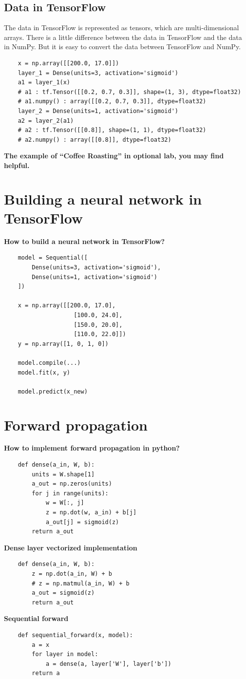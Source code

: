 \subsection*{Data in TensorFlow}
The data in TensorFlow is represented as tensors, which are multi-dimensional arrays.
There is a little difference between the data in TensorFlow and the data in NumPy.
But it is easy to convert the data between TensorFlow and NumPy.
\begin{verbatim}
    x = np.array([[200.0, 17.0]])
    layer_1 = Dense(units=3, activation='sigmoid')
    a1 = layer_1(x)
    # a1 : tf.Tensor([[0.2, 0.7, 0.3]], shape=(1, 3), dtype=float32)
    # a1.numpy() : array([[0.2, 0.7, 0.3]], dtype=float32)
    layer_2 = Dense(units=1, activation='sigmoid')
    a2 = layer_2(a1)
    # a2 : tf.Tensor([[0.8]], shape=(1, 1), dtype=float32)
    # a2.numpy() : array([[0.8]], dtype=float32)
\end{verbatim}
\textbf{The example of ``Coffee Roasting'' in optional lab, you may find helpful.}

\section{Building a neural network in TensorFlow}
\textbf{How to build a neural network in TensorFlow?}
\begin{verbatim}
    model = Sequential([
        Dense(units=3, activation='sigmoid'),
        Dense(units=1, activation='sigmoid')
    ])

    x = np.array([[200.0, 17.0],
                    [100.0, 24.0],
                    [150.0, 20.0],
                    [110.0, 22.0]])
    y = np.array([1, 0, 1, 0])

    model.compile(...)
    model.fit(x, y)

    model.predict(x_new)
\end{verbatim}

\section{Forward propagation}
\textbf{How to implement forward propagation in python?}
\begin{verbatim}
    def dense(a_in, W, b):
        units = W.shape[1]
        a_out = np.zeros(units)
        for j in range(units):
            w = W[:, j]
            z = np.dot(w, a_in) + b[j]
            a_out[j] = sigmoid(z)
        return a_out
\end{verbatim}
\par
\textbf{Dense layer vectorized implementation}
\begin{verbatim}
    def dense(a_in, W, b):
        z = np.dot(a_in, W) + b
        # z = np.matmul(a_in, W) + b
        a_out = sigmoid(z)
        return a_out
\end{verbatim}
\par
\textbf{Sequential forward}
\begin{verbatim}
    def sequential_forward(x, model):
        a = x
        for layer in model:
            a = dense(a, layer['W'], layer['b'])
        return a
\end{verbatim}

